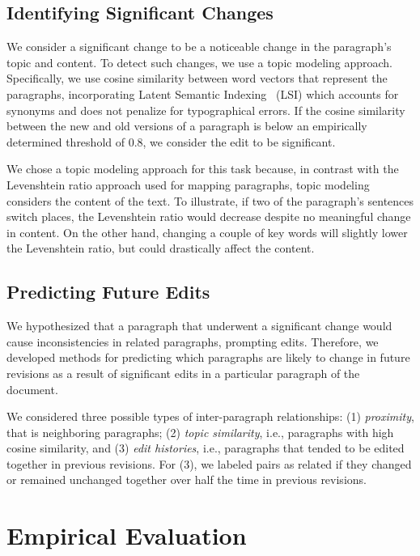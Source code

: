 \subsection{Identifying Significant
Changes}\label{identifying-significant-changes}

We consider a significant change to be a noticeable change in the
paragraph's topic and content. To detect such changes, we use a topic
modeling approach. Specifically, we use cosine similarity between word
vectors that represent the paragraphs, incorporating Latent Semantic
Indexing~\cite{deerwester1990indexing} (LSI) which accounts for synonyms
and does not penalize for typographical errors. If the cosine similarity
between the new and old versions of a paragraph is below an empirically
determined threshold of 0.8, we consider the edit to be significant.

We chose a topic modeling approach for this task because, in contrast
with the Levenshtein ratio approach used for mapping paragraphs, topic
modeling considers the content of the text. To illustrate, if two of the
paragraph's sentences switch places, the Levenshtein ratio would
decrease despite no meaningful change in content. On the other hand,
changing a couple of key words will slightly lower the Levenshtein
ratio, but could drastically affect the content.

\subsection{Predicting Future Edits}\label{predicting-future-edits}

We hypothesized that a paragraph that underwent a significant change
would cause inconsistencies in related paragraphs, prompting edits.
Therefore, we developed methods for predicting which paragraphs are
likely to change in future revisions as a result of significant edits in
a particular paragraph of the document.

We considered three possible types of inter-paragraph relationships: (1)
\emph{proximity}, that is neighboring paragraphs; (2) \emph{topic
similarity}, i.e., paragraphs with high cosine similarity, and (3)
\emph{edit histories}, i.e., paragraphs that tended to be edited
together in previous revisions. For (3), we labeled pairs as related if
they changed or remained unchanged together over half the time in
previous revisions.

\section{Empirical Evaluation}\label{empirical-evaluation}

